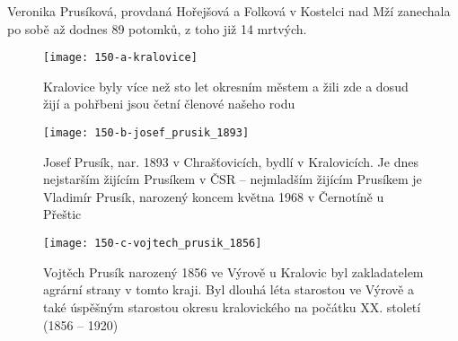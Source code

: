 \documentclass[../dejiny-rodu-prusiku.tex]{subfiles}
\begin{document}
Veronika Prusíková, provdaná Hořejšová a Folková v Kostelci nad Mží zanechala po sobě až dodnes 89 potomků, z toho již 14 mrtvých.

\begin{figure}
\centering
\texttt{[image: 150-a-kralovice]}
\caption{Kralovice byly více než sto let okresním městem a žili zde a dosud žijí a pohřbeni jsou četní členové našeho rodu}
\label{fig:150-a-kralovice}
\end{figure}

\begin{figure}
\centering
\texttt{[image: 150-b-josef\_prusik\_1893]}
\caption{Josef Prusík, nar. 1893 v Chrašťovicích, bydlí v Kralovicích. Je dnes nejstarším žijícím Prusíkem v ČSR – nejmladším žijícím Prusíkem je Vladimír Prusík, narozený koncem května 1968 v Černotíně u Přeštic}
\label{fig:150-b-josef_prusik_1893}
\end{figure}

\begin{figure}
\centering
\texttt{[image: 150-c-vojtech\_prusik\_1856]}
\caption{Vojtěch Prusík narozený 1856 ve Výrově u Kralovic byl zakladatelem agrární strany v tomto kraji. Byl dlouhá léta starostou ve Výrově a také úspěšným starostou okresu kralovického na počátku XX. století (1856 – 1920)}
\label{fig:150-c-vojtech_prusik_1856}
\end{figure}

\end{document}

